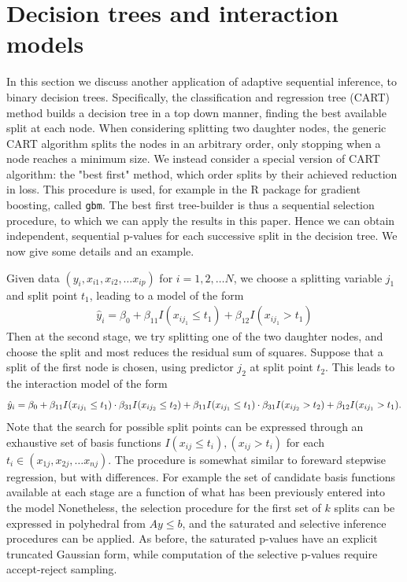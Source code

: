 \documentclass{article}
\begin{document}

\section{Decision trees and interaction models}
In this section we discuss another application of adaptive sequential inference, to binary decision trees.
Specifically, the classification and regression tree  (CART)  method builds a decision tree in a top down manner, finding the best available split
at each node.  When considering splitting two daughter nodes, the generic CART algorithm splits the nodes in an arbitrary order, only stopping when a node
reaches a minimum size.  We instead consider a  special version of CART  algorithm:  the   "best first"  method, which order splits by their achieved reduction in loss.
This procedure is used, for example in the R package for gradient boosting, called {\tt gbm}.
The best first tree-builder is thus a sequential selection  procedure,  to which we can apply the results in this paper. Hence we can obtain independent, sequential p-values
for each successive split in the decision  tree. We now give some details and an example.

Given data $(y_i, x_{i1}, x_{i2},\ldots x_{ip})$ for $i=1,2,\ldots N$,
we choose a splitting  variable $j_1$ and split point $t_1$, leading to a model of the form
\begin{eqnarray}
\hat y_i=\beta_0 +\beta_{11} I(x_{ij_1} \leq t_1) +\beta_{12} I(x_{ij_1} > t_1)
\end{eqnarray}
Then at the second stage, we try splitting one of the two daughter nodes, and choose the split and most reduces the residual sum of squares.
Suppose that a split of the first node is chosen, using predictor $j_2$ at split point $t_2$.  This leads to the interaction model of the form
\begin{eqnarray}
\hat y_i=\beta_0 +\beta_{11} I(x_{ij_1} \leq t_1) \cdot \beta_{31} I(x_{ij_2} \leq t_2)+   \beta_{11} I(x_{ij_1} \leq t_1) \cdot  \beta_{31} I(x_{ij_2} > t_2)  +\beta_{12} I(x_{ij_1} > t_1).\cr
\label{eqn:intmodel}
\end{eqnarray}
Note that the search for possible split points can be expressed through an exhaustive set of basis functions $I(x_{ij} \leq  t_i), (x_{ij}  > t_i)$ for each $t_i \in (x_{1j}, x_{2j}, \ldots x_{nj})$.
The procedure is somewhat similar to foreward stepwise regression, but with differences.
For example the set of candidate basis functions available at each stage are a function of what has been  previously entered into the model
Nonetheless,  the selection procedure  for the first set of $k$ splits can be expressed in polyhedral from $Ay \leq b$, and the saturated and selective inference procedures can be applied.
As before, the saturated p-values have an explicit truncated Gaussian form, while computation of the selective p-values require accept-reject sampling.
\end{document}
